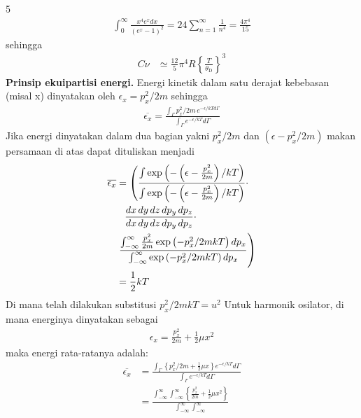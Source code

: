 \documentclass[a4paper  , 6 pt]{article}
\begin{document}
\begin{tiny}
\begin{multicols} {5}
\begin{align}
\int_{0}^{\infty } \frac{x^4 e^x dx }{(e^x - 1)^2 } = 24 \sum_{n =1}^{\infty} \frac{1}{n^4}  = \frac{4 \pi^4}{15} \nonumber
\end{align}
sehingga
\begin{align}
 C\nu &  \simeq \frac{12}{5} \pi^4  R \left \lbrace  \frac{T}{\theta_\mathrm{D}}\right \rbrace^3 \nonumber 
\end{align} \newline
\textbf{Prinsip ekuipartisi energi.} \newline
Energi kinetik dalam satu derajat kebebasan (misal x) dinyatakan oleh $\epsilon_x = p_x^2 /2m $ sehingga 
\begin{align}
\overline{\epsilon_x} = \frac{\int_{\Gamma} p_x^2 /2m \, e^{-\epsilon/kT d \Gamma}}{\int_\Gamma e^{-\epsilon /kT 
} d\Gamma}
\end{align}
Jika energi dinyatakan dalam dua bagian yakni $p_x^2 /2m $ dan $(\epsilon - p_x^2 / 2m)$ makan persamaan di atas dapat dituliskan menjadi
\begin{align}
\overline{ \epsilon_x} & = \left( \frac{\int \exp \left(- \left( \epsilon - \frac{p_x^2}{2m }\right)/kT \right)}{\int \exp \left( - \left( \epsilon - \frac{p_x^2}{2m } \right)/kT\right) } \cdot \right.  \nonumber \\
& \hspace{0.3 cm }  \frac{ dx \, dy \, dz \, dp_y \, dp_z}{dx \, dy \, dz \, dp_y \, dp_z } \cdot \nonumber \\ 
& \hspace{0 cm}
\left.
\frac{\int_{-\infty}^{\infty} \frac{p_x^2}{2m} \exp \left(- p_x^2 /2mkT\right) dp_x }{\int_{-\infty}^{\infty} \exp\left( -p_x^2 /2mkT \right) dp_x } \right) \nonumber \\
& = \frac{1}{2} kT  \nonumber
\end{align}
Di mana telah dilakukan substitusi $p_x^2 / 2mk T  = u^2 $ \newline
Untuk harmonik osilator, di mana energinya dinyatakan sebagai
\begin{align}
\epsilon_x = \frac{p_x^2}{2m } + \frac{1}{2} \mu x^2 
\end{align}
maka energi rata-ratanya adalah:
\begin{align}
\overline{\epsilon_x} & = \frac{\int_\Gamma \left \lbrace p_x^2 /2m + \frac{1}{2} \mu x  \right \rbrace e^{-\epsilon/kT}d \Gamma}{\int_\Gamma e^{- \epsilon /kT} d \Gamma } \nonumber \\
& = \frac{\int_{-\infty}^{\infty} \int_{-\infty}^{\infty}  \left \lbrace   \frac{p_x^2  }{2m} + \frac{1}{2} \mu x^2\right \rbrace }{\int_{-\infty}^{\infty} \int_{-\infty}^{\infty} } \nonumber \\

\end{align}
\end{multicols}
\end{tiny}
\end{document}
